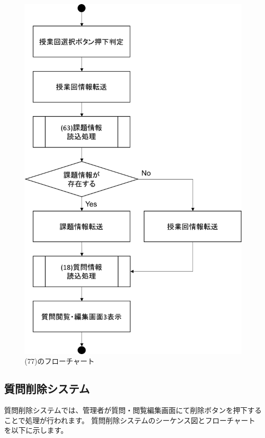 \begin{figure}[htbp]
  \begin{center}
    \includegraphics[width=0.5\linewidth,clip]{./img/flow/77.png}
    \caption{(77)のフローチャート}\label{fig:77}
  \end{center}
\end{figure}

\clearpage

\subsection{質問削除システム}
質問削除システムでは、管理者が質問・閲覧編集画面にて削除ボタンを押下することで処理が行われます。
質問削除システムのシーケンス図とフローチャートを以下に示します。



